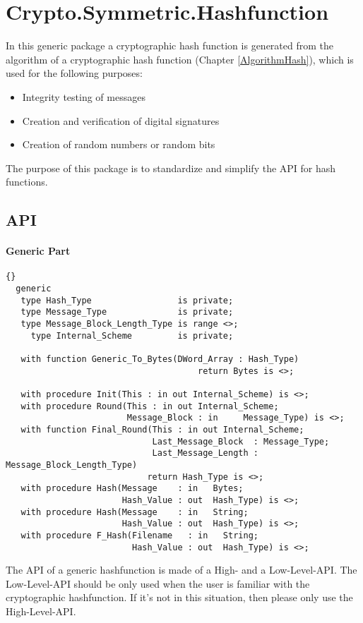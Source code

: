 \chapter{Crypto.Symmetric.Hashfunction}\label{Hash}
In this generic package a cryptographic hash function is generated
from the algorithm of a cryptographic hash function (Chapter
\ref{AlgorithmHash}), which is used for the following purposes:
\begin{itemize}
\item Integrity testing of messages
\item Creation and verification of digital signatures
\item Creation of random numbers or random bits
\end{itemize}
The purpose of this package is to standardize and simplify the API for
hash functions.
\section{API}
\subsubsection*{Generic Part}
\begin{lstlisting}{}
  generic
   type Hash_Type                 is private;
   type Message_Type              is private;
   type Message_Block_Length_Type is range <>;
	 type Internal_Scheme		  is private;
	
   with function Generic_To_Bytes(DWord_Array : Hash_Type)
   								      return Bytes is <>;
												
   with procedure Init(This : in out Internal_Scheme) is <>;
   with procedure Round(This : in out Internal_Scheme;
                        Message_Block : in     Message_Type) is <>;
   with function Final_Round(This : in out Internal_Scheme;
                             Last_Message_Block  : Message_Type;
                             Last_Message_Length : Message_Block_Length_Type)
                            return Hash_Type is <>;
   with procedure Hash(Message    : in   Bytes;
                       Hash_Value : out  Hash_Type) is <>;
   with procedure Hash(Message    : in   String;
                       Hash_Value : out  Hash_Type) is <>;
   with procedure F_Hash(Filename   : in   String;
                         Hash_Value : out  Hash_Type) is <>;
\end{lstlisting}
The API of a generic hashfunction is made of a High- and a
Low-Level-API. The Low-Level-API should be only used when the user is
familiar with the cryptographic hashfunction. If it's not in this
situation, then please only use the High-Level-API.


